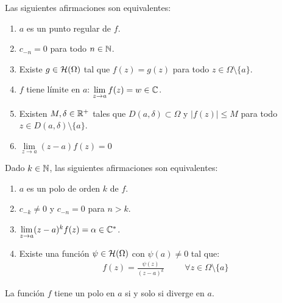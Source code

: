 \documentclass[12pt]{article}
\begin{document}
    \begin{prop}
        Las siguientes afirmaciones son equivalentes:
        \begin{enumerate}
            \item $a$ es un punto regular de $f$.
            \item $c_{-n} = 0 $ para todo $n\in \mathbb{N}$.
            \item Existe $g\in \mathcal{H}(\Omega)$ tal que $f(z) = g(z)$ para todo $z \in \Omega \setminus \{a\}$.
            \item $f$ tiene límite en $a$: $\lim\limits_{z\to a } f(z) = w \in \mathbb{C}$.
            \item Existen $M,\delta\in \mathbb{R}^+$ tales que $D(a, \delta) \subset \Omega$ y $|f(z)|\leq M$ para todo $z\in D(a,\delta)\setminus \{a\}$.
            \item $\lim\limits_{z\to a} (z-a)f(z) = 0$
        \end{enumerate}
    \end{prop}

    \begin{prop} Dado $k \in \mathbb{N}$, las siguientes afirmaciones son equivalentes:
        \begin{enumerate}
            \item $a$ es un polo de orden $k$ de $f$.
            \item $c_{-k}\neq 0$ y $c_{-n} = 0$ para $n> k$.
            \item $\lim\limits_{z \to a}(z-a)^kf(z) = \alpha \in \mathbb{C}^*$.
            \item Existe una función $\psi\in \mathcal{H}(\Omega)$ con $\psi(a) \neq 0$ tal que:
            \begin{gather*}
                f(z) = \frac{\psi(z)}{(z-a)^k} \hspace{1cm} \forall z \in \Omega \setminus \{a\}
            \end{gather*}
        \end{enumerate}
    \end{prop}

    \begin{prop}
        La función $f$ tiene un polo en $a$ si y solo si diverge en $a$.
    \end{prop}
\end{document}
